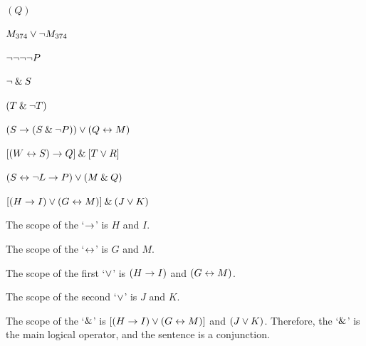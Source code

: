 \problempart
\label{pr.wiffTFL}
\begin{earg}
\item $(Q)$\hfill {}
\medskip

\item $M_{374} \vee {\neg} M_{374}$ \hfill {}
\medskip

\item ${\neg} {\neg} {\neg} {\neg} P$ \hfill {}
\medskip

\item ${\neg} \mathbin{\&} S$\hfill {}
\medskip

\item $(T \mathbin{\&} {\neg} T)$\hfill {}
\medskip

\item $(S \rightarrow (S \mathbin{\&} {\neg} P)) \vee (Q \leftrightarrow M)$\hfill {}
\medskip

\item $[(W \leftrightarrow S) \rightarrow Q] \mathbin{\&} [T \vee R]$\hfill {}
\medskip

\item $(S \leftrightarrow {\neg} L \rightarrow P) \vee (M \mathbin{\&} Q)$\hfill {}
\medskip
\end{earg}



\problempart $[(H \rightarrow I) \vee (G \leftrightarrow M)] \mathbin{\&} (J \vee K)$
\medskip

\noindent The scope of the `$\rightarrow$' is $H$ and $I$. 

\noindent The scope of the `$\leftrightarrow$' is $G$ and $M$. 

\noindent The scope of the first `$\vee$' is $(H \rightarrow I)$ and $(G \leftrightarrow M)$.

\noindent The scope of the second `$\vee$' is $J$ and $K$.

\noindent\hangindent=3mm The scope of the `$\mathbin{\&}$' is $[(H \rightarrow I) \vee (G \leftrightarrow M)]$ and $(J \vee K)$. Therefore, the `$\mathbin{\&}$' is the main logical operator, and the sentence is a conjunction.


